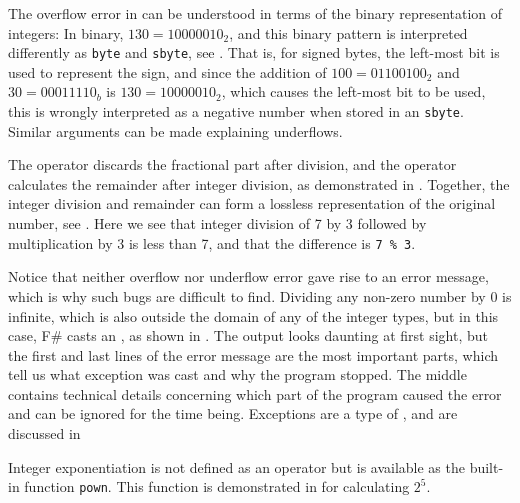 \documentclass[fsharpNotes.tex]{subfiles}
\begin{document}
The overflow error in  can be understood in terms of the binary representation of integers: In binary, $130=10000010_2$, and this binary pattern is interpreted differently as \lstinline{byte} and \lstinline{sbyte}, see .
%
%
That is, for signed bytes, the left-most bit is used to represent the sign, and since the addition of $100=01100100_2$ and $30=00011110_b$ is $130=10000010_2$, which causes the left-most bit to be used, this is wrongly interpreted as a negative number when stored in an \lstinline{sbyte}. Similar arguments can be made explaining underflows.

The  operator discards the fractional part after division, and the  operator calculates the remainder after integer division, as demonstrated in .
%
%
Together, the integer division and remainder can form a lossless representation of the original number, see .
%
%
Here we see that integer division of 7 by 3 followed by multiplication by 3 is less than 7, and that the difference is \lstinline!7 % 3!.

Notice that neither overflow nor underflow error gave rise to an error message, which is why such bugs are difficult to find. 
 Dividing any non-zero number by 0 is infinite, which is also outside the domain of any of the integer types, but in this case, F\# casts an , as shown in .
%
%
The output looks daunting at first sight, but the first and last lines of the error message are the most important parts, which tell us what exception was cast and why the program stopped. The middle contains technical details concerning which part of the program caused the error and can be ignored for the time being. Exceptions are a type of , and are discussed in 

Integer exponentiation is not defined as an operator but is available as the built-in function \lstinline|pown|. This function is demonstrated in  for calculating $2^5$.
%
%
\end{document}
